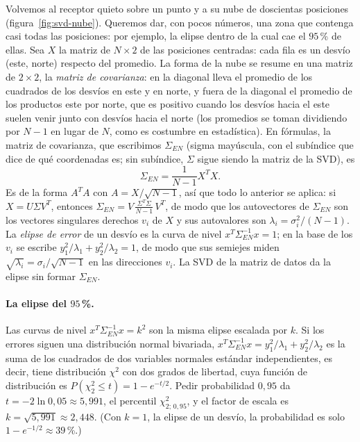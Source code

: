 Volvemos al receptor quieto sobre un punto y a su nube de doscientas posiciones
(figura~\ref{fig:svd-nube}). Queremos dar, con pocos números, una zona que contenga casi todas
las posiciones: por ejemplo, la elipse dentro de la cual cae el \(95\)\,\% de ellas. Sea \(X\)
la matriz de \(N\times2\) de las posiciones centradas: cada fila es un desvío (este, norte)
respecto del promedio. La forma de la nube se resume en una matriz de \(2\times2\), la
\emph{matriz de covarianza}: en la diagonal lleva el promedio de los cuadrados de los desvíos en
este y en norte, y fuera de la diagonal el promedio de los productos este por norte, que es
positivo cuando los desvíos hacia el este suelen venir junto con desvíos hacia el norte (los
promedios se toman dividiendo por \(N-1\) en lugar de \(N\), como es costumbre en estadística).
En fórmulas, la matriz de covarianza, que escribimos \(\Sigma_{EN}\) (sigma mayúscula, con el subíndice
que dice de qué coordenadas es; sin subíndice, \(\Sigma\) sigue siendo la matriz de la SVD), es
\[
  \Sigma_{EN}=\frac1{N-1}X^TX .
\]
Es de la forma \(A^TA\) con \(A=X/\sqrt{N-1}\), así que todo lo anterior se aplica: si
\(X=U\Sigma V^T\), entonces \(\Sigma_{EN}=V\,\frac{\Sigma^T\Sigma}{N-1}\,V^T\), de modo que los
autovectores de \(\Sigma_{EN}\) son los vectores singulares derechos \(v_i\) de \(X\) y sus autovalores
son \(\lambda_i=\sigma_i^2/(N-1)\). La \emph{elipse de error} de un desvío es la curva de
nivel \(x^T\Sigma_{EN}^{-1}x=1\); en la base de los \(v_i\) se escribe
\(y_1^2/\lambda_1+y_2^2/\lambda_2=1\), de modo que sus semiejes miden
\(\sqrt{\lambda_i}=\sigma_i/\sqrt{N-1}\) en las direcciones \(v_i\). La SVD de la matriz de datos da la elipse sin formar \(\Sigma_{EN}\).

\paragraph{La elipse del \texorpdfstring{\(95\)\,\%}{95 \%}.} Las curvas de nivel
\(x^T\Sigma_{EN}^{-1}x=k^2\) son la misma elipse escalada por \(k\). Si los errores siguen una
distribución normal bivariada, \(x^T\Sigma_{EN}^{-1}x=y_1^2/\lambda_1+y_2^2/\lambda_2\) es la suma de
los cuadrados de dos variables normales estándar independientes, es decir, tiene
distribución \(\chi^2\) con dos grados de libertad, cuya función de distribución es
\(P(\chi^2_2\le t)=1-e^{-t/2}\). Pedir probabilidad \(0{,}95\) da
\(t=-2\ln0{,}05\approx5{,}991\), el percentil \(\chi^2_{2;\,0{,}95}\), y el factor de escala
es \(k=\sqrt{5{,}991}\approx2{,}448\). (Con \(k=1\), la elipse de un desvío, la probabilidad
es solo \(1-e^{-1/2}\approx39\)\,\%.)

